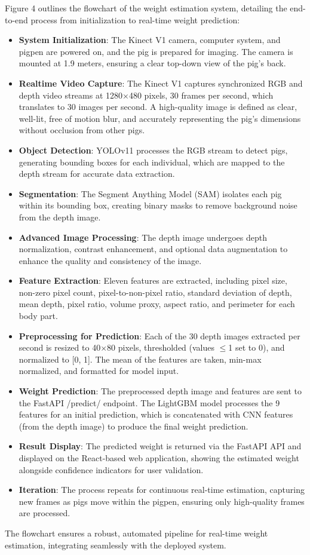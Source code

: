 {Figure 4 outlines the flowchart of the weight estimation system, detailing the end-to-end process from initialization to real-time weight prediction:
\begin{itemize}
	\item \textbf{System Initialization}: The Kinect V1 camera, computer system, and pigpen are powered on, and the pig is prepared for imaging. The camera is mounted at 1.9 meters, ensuring a clear top-down view of the pig’s back.
	\item \textbf{Realtime Video Capture}: The Kinect V1 captures synchronized RGB and depth video streams at 1280$\times$480 pixels, 30 frames per second, which translates to 30 images per second. A high-quality image is defined as clear, well-lit, free of motion blur, and accurately representing the pig’s dimensions without occlusion from other pigs.
	\item \textbf{Object Detection}: YOLOv11 processes the RGB stream to detect pigs, generating bounding boxes for each individual, which are mapped to the depth stream for accurate data extraction.
	\item \textbf{Segmentation}: The Segment Anything Model (SAM) isolates each pig within its bounding box, creating binary masks to remove background noise from the depth image.
	\item \textbf{Advanced Image Processing}: The depth image undergoes depth normalization, contrast enhancement, and optional data augmentation to enhance the quality and consistency of the image.
	\item \textbf{Feature Extraction}: Eleven features are extracted, including pixel size, non-zero pixel count, pixel-to-non-pixel ratio, standard deviation of depth, mean depth, pixel ratio, volume proxy, aspect ratio, and perimeter for each body part.
	\item \textbf{Preprocessing for Prediction}: Each of the 30 depth images extracted per second is resized to 40$\times$80 pixels, thresholded (values $\leq$1 set to 0), and normalized to [0, 1]. The mean of the features are taken, min-max normalized, and formatted for model input.
	\item \textbf{Weight Prediction}: The preprocessed depth image and features are sent to the FastAPI /predict/ endpoint. The LightGBM model processes the 9 features for an initial prediction, which is concatenated with CNN features (from the depth image) to produce the final weight prediction.
	\item \textbf{Result Display}: The predicted weight is returned via the FastAPI API and displayed on the React-based web application, showing the estimated weight alongside confidence indicators for user validation.
	\item \textbf{Iteration}: The process repeats for continuous real-time estimation, capturing new frames as pigs move within the pigpen, ensuring only high-quality frames are processed.
\end{itemize}
The flowchart ensures a robust, automated pipeline for real-time weight estimation, integrating seamlessly with the deployed system.

}
